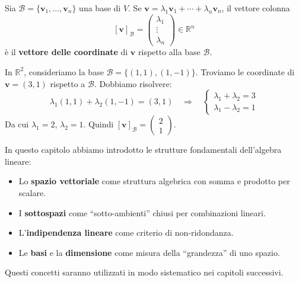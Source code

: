 \begin{definitionbox}
Sia $\mathcal{B} = \{\mathbf{v}_1, \ldots, \mathbf{v}_n\}$ una base di $V$. Se $\mathbf{v} = \lambda_1\mathbf{v}_1 + \cdots + \lambda_n\mathbf{v}_n$, il vettore colonna
\[ [\mathbf{v}]_{\mathcal{B}} = \begin{pmatrix} \lambda_1 \\ \vdots \\ \lambda_n \end{pmatrix} \in \mathbb{R}^n \]
è il \textbf{vettore delle coordinate} di $\mathbf{v}$ rispetto alla base $\mathcal{B}$.
\end{definitionbox}

\begin{examplebox}
In $\mathbb{R}^2$, consideriamo la base $\mathcal{B} = \{(1,1), (1,-1)\}$. Troviamo le coordinate di $\mathbf{v} = (3, 1)$ rispetto a $\mathcal{B}$. Dobbiamo risolvere:
\[ \lambda_1(1,1) + \lambda_2(1,-1) = (3,1) \quad \Longrightarrow \quad \begin{cases} \lambda_1 + \lambda_2 = 3 \\ \lambda_1 - \lambda_2 = 1 \end{cases} \]
Da cui $\lambda_1 = 2$, $\lambda_2 = 1$. Quindi $[\mathbf{v}]_{\mathcal{B}} = \begin{pmatrix} 2 \\ 1 \end{pmatrix}$.
\end{examplebox}

\begin{notebox}
In questo capitolo abbiamo introdotto le strutture fondamentali dell'algebra lineare:
\begin{itemize}
    \item Lo \textbf{spazio vettoriale} come struttura algebrica con somma e prodotto per scalare.
    \item I \textbf{sottospazi} come ``sotto-ambienti'' chiusi per combinazioni lineari.
    \item L'\textbf{indipendenza lineare} come criterio di non-ridondanza.
    \item Le \textbf{basi} e la \textbf{dimensione} come misura della ``grandezza'' di uno spazio.
\end{itemize}
Questi concetti saranno utilizzati in modo sistematico nei capitoli successivi.
\end{notebox}

